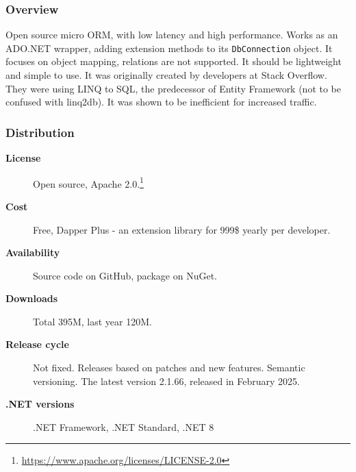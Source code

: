\subsubsection*{Overview}
Open source micro ORM, with low latency and high performance. Works as an ADO.NET wrapper, adding extension methods to its \texttt{DbConnection} object. It focuses on object mapping, relations are not supported. It should be lightweight and simple to use. It was originally created by developers at Stack Overflow. They were using LINQ to SQL, the predecessor of Entity Framework (not to be confused with linq2db). It was shown to be inefficient for increased traffic.

\subsubsection*{Distribution}
\begin{description}
    \item[\textbf{License}] Open source, Apache 2.0.\footnote{\url{https://www.apache.org/licenses/LICENSE-2.0}}
    \item[\textbf{Cost}] Free, Dapper Plus - an extension library for 999\$ yearly per developer.
    \item[\textbf{Availability}] Source code on GitHub, package on NuGet.
    \item[\textbf{Downloads}] Total 395M, last year 120M.
    \item[\textbf{Release cycle}] Not fixed. Releases based on patches and new features. Semantic versioning. The latest version 2.1.66, released in February 2025. 
    \item[\textbf{.NET versions}] .NET Framework, .NET Standard, .NET 8
\end{description}

